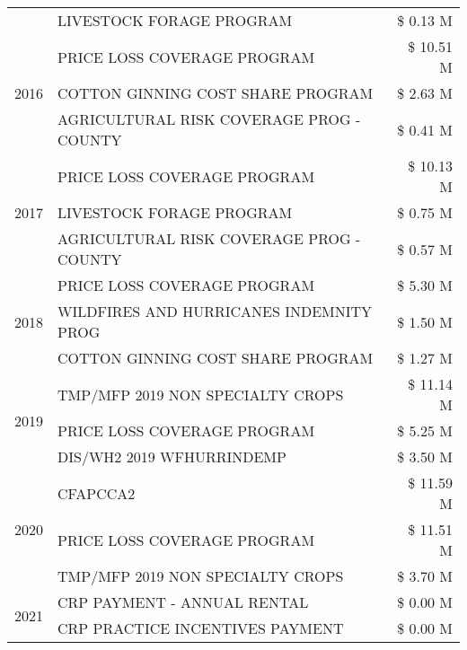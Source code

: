 \begin{tabular}{llr}
 & LIVESTOCK FORAGE PROGRAM & \$ 0.13 M \\
\cline{1-3}
\multirow[t]{3}{*}{2016} & PRICE LOSS COVERAGE PROGRAM                   & \$ 10.51 M \\
 & COTTON GINNING COST SHARE PROGRAM             & \$ 2.63 M \\
 & AGRICULTURAL RISK COVERAGE PROG - COUNTY      & \$ 0.41 M \\
\cline{1-3}
\multirow[t]{3}{*}{2017} & PRICE LOSS COVERAGE PROGRAM & \$ 10.13 M \\
 & LIVESTOCK FORAGE PROGRAM & \$ 0.75 M \\
 & AGRICULTURAL RISK COVERAGE PROG - COUNTY & \$ 0.57 M \\
\cline{1-3}
\multirow[t]{3}{*}{2018} & PRICE LOSS COVERAGE PROGRAM & \$ 5.30 M \\
 & WILDFIRES AND HURRICANES INDEMNITY PROG & \$ 1.50 M \\
 & COTTON GINNING COST SHARE PROGRAM & \$ 1.27 M \\
\cline{1-3}
\multirow[t]{3}{*}{2019} & TMP/MFP 2019 NON SPECIALTY CROPS & \$ 11.14 M \\
 & PRICE LOSS COVERAGE PROGRAM & \$ 5.25 M \\
 & DIS/WH2 2019 WFHURRINDEMP & \$ 3.50 M \\
\cline{1-3}
\multirow[t]{3}{*}{2020} & CFAPCCA2 & \$ 11.59 M \\
 & PRICE LOSS COVERAGE PROGRAM & \$ 11.51 M \\
 & TMP/MFP 2019 NON SPECIALTY CROPS & \$ 3.70 M \\
\cline{1-3}
\multirow[t]{2}{*}{2021} & CRP PAYMENT - ANNUAL RENTAL & \$ 0.00 M \\
 & CRP PRACTICE INCENTIVES PAYMENT & \$ 0.00 M \\
\cline{1-3}
\bottomrule
\end{tabular}
